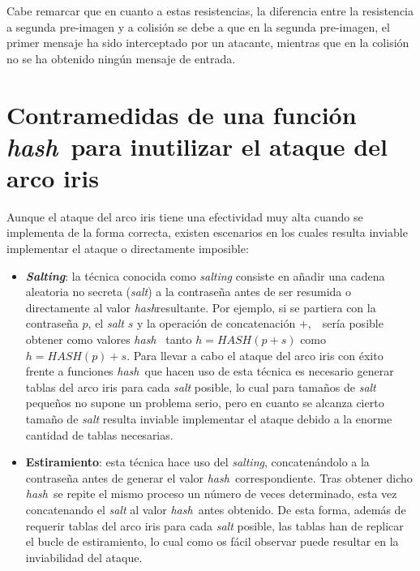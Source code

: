 \documentclass[12pt,spanish,listoffigures,listoftables]{tfgetsinf}
\newcommand{\hash}{\textit{hash}}
\begin{document}
Cabe remarcar que en cuanto a estas resistencias, la diferencia entre la resistencia a segunda pre-imagen y a colisión se debe a que en la segunda pre-imagen, el primer mensaje ha sido interceptado por un atacante, mientras que en la colisión no se ha obtenido ningún mensaje de entrada.
~\\

\section{Contramedidas de una función \hash~para inutilizar el ataque del arco iris} \label{salt}

Aunque el ataque del arco iris tiene una efectividad muy alta cuando se implementa de la forma correcta, existen escenarios en los cuales resulta inviable implementar el ataque o directamente imposible:

\begin{itemize}

    \item \textbf{\textit{Salting}}: la técnica conocida como \textit{salting} consiste en añadir una cadena aleatoria no secreta (\textit{salt}) a la contraseña antes de ser resumida o directamente al valor \hash resultante. Por ejemplo, si se partiera con la contraseña $p$, el \textit{salt} $s$ y la operación de concatenación $+$,~~sería posible obtener como valores \hash~ tanto $h = HASH(p+s)$ como $h = HASH(p)+s$. Para llevar a cabo el ataque del arco iris con éxito frente a funciones \hash~que hacen uso de esta técnica es necesario generar tablas del arco iris para cada \textit{salt} posible, lo cual para tamaños de \textit{salt} pequeños no supone un problema serio, pero en cuanto se alcanza cierto tamaño de \textit{salt} resulta inviable implementar el ataque debido a la enorme cantidad de tablas necesarias.
    
    \item \textbf{Estiramiento}: esta técnica hace uso del \textit{salting}, concatenándolo a la contraseña antes de generar el valor \hash~correspondiente. Tras obtener dicho \hash~se repite el mismo proceso un número de veces determinado, esta vez concatenando el \textit{salt} al valor \hash~antes obtenido. De esta forma, además de requerir tablas del arco iris para cada \textit{salt} posible, las tablas han de replicar el bucle de estiramiento, lo cual como os fácil observar puede resultar en la inviabilidad del ataque.
    
    
\end{itemize}
~\\
\end{document}

